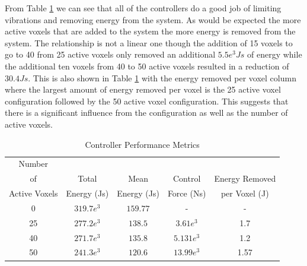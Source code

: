 \documentclass[11pt]{ucthesis}
\begin{document}
From Table \ref{tab:energy} we can see that all of the controllers do a good job of limiting vibrations and removing energy from the system. As would be expected the more active voxels that are added to the system the more energy is removed from the system. The relationship is not a linear one though the addition of 15 voxels to go to 40 from 25 active voxels only removed an additional $5.5e^3 Js$ of energy while the additional ten voxels from 40 to 50 active voxels resulted in a reduction of $30.4 Js$. This is also shown in Table \ref{tab:energy} with the energy removed per voxel column where the largest amount of energy removed per voxel is the 25 active voxel configuration followed by the 50 active voxel configuration. This suggests that there is a significant influence from the configuration as well as the number of active voxels.

\begin{table}[thpb]
\caption{Controller Performance Metrics}
\label{tab:energy}
\begin{center}
\begin{tabular}{|c||c||c||c||c|}
\hline
Number&&&&\\
of&Total&Mean&Control&Energy Removed\\
Active Voxels&Energy (Js)&Energy (Js)&Force (Ns)& per Voxel (J)\\
\hline
0 &$319.7e^{3}$&$159.77$&-&-\\
\hline
25&$277.2e^{3}$&$138.5$&$3.61e^{3}$&1.7\\
\hline
40&$271.7e^{3}$&$135.8$&$5.131e^{3}$&1.2\\
\hline
50&$241.3e^{3}$&$120.6$&$13.99e^{3}$&1.57\\
\hline
\end{tabular}
\end{center}
\end{table}
\end{document}
